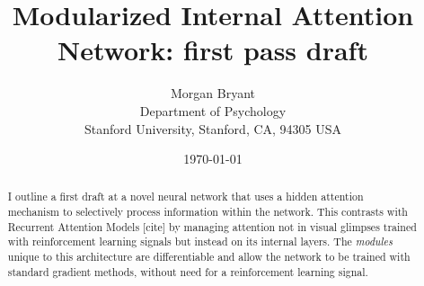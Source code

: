 \documentclass[12pt]{article}
\title{Modularized Internal Attention Network: first pass draft}
\author{
        Morgan Bryant\\
        Department of Psychology\\
		Stanford University, Stanford, CA, 94305 USA
}
\date{\today}
\begin{document}
\maketitle

\begin{abstract}
I outline a first draft at a novel neural network that uses a hidden attention mechanism to selectively process information within the network.  This contrasts with Recurrent Attention Models [cite] by managing attention not in visual glimpses trained with reinforcement learning signals but instead on its internal layers.  The \textit{modules} unique to this architecture are differentiable and allow the network to be trained with standard gradient methods, without need for a reinforcement learning signal.
\end{abstract}
\end{document}
